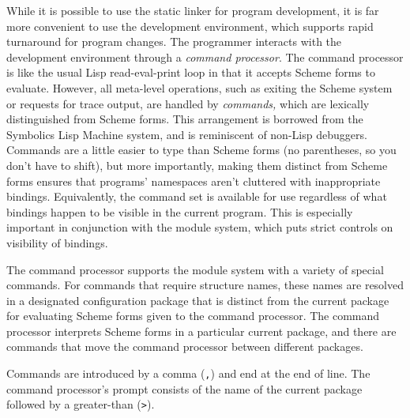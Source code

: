 While it is possible to use the \hack{} static linker for program
development, it is far more convenient to use the development
environment, which supports rapid turnaround for program changes.  The
programmer interacts with the development environment through a {\em
command processor}.  The command processor is like the usual Lisp
read-eval-print loop in that it accepts Scheme forms to evaluate.
However, all meta-level operations, such as exiting the Scheme system
or requests for trace output, are handled by {\em commands,} which are
lexically distinguished from Scheme forms.  This arrangement is
borrowed from the Symbolics Lisp Machine system, and is reminiscent of
non-Lisp debuggers.  Commands are a little easier to type than Scheme
forms (no parentheses, so you don't have to shift), but more
importantly, making them distinct from Scheme forms ensures that
programs' namespaces aren't cluttered with inappropriate bindings.
Equivalently, the command set is available for use regardless of what
bindings happen to be visible in the current program.  This is
especially important in conjunction with the module system, which puts
strict controls on visibility of bindings.

The \hack{} command processor supports the module system with a
variety of special commands.  For commands that require structure
names, these names are resolved in a designated configuration package
that is distinct from the current package for evaluating Scheme forms
given to the command processor.  The command processor interprets
Scheme forms in a particular current package, and there are commands
that move the command processor between different packages.

Commands are introduced by a comma ({\tt,}) and end at the end of
line.  The command processor's prompt consists of the name of the
current package followed by a greater-than ({\tt>}).

